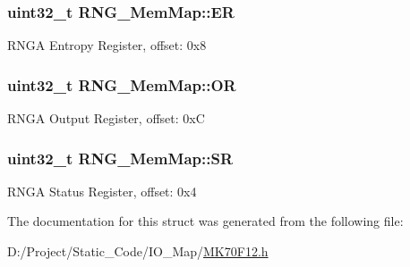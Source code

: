 \subsubsection[{E\+R}]{\setlength{\rightskip}{0pt plus 5cm}uint32\+\_\+t R\+N\+G\+\_\+\+Mem\+Map\+::\+E\+R}\label{struct_r_n_g___mem_map_a00c023d8dafb81ac55c86b3ad8decb3d}
R\+N\+G\+A Entropy Register, offset\+: 0x8 \hypertarget{struct_r_n_g___mem_map_a28a39f4167d28546cea918687d2951f1}{}
\subsubsection[{O\+R}]{\setlength{\rightskip}{0pt plus 5cm}uint32\+\_\+t R\+N\+G\+\_\+\+Mem\+Map\+::\+O\+R}\label{struct_r_n_g___mem_map_a28a39f4167d28546cea918687d2951f1}
R\+N\+G\+A Output Register, offset\+: 0x\+C \hypertarget{struct_r_n_g___mem_map_a5d258b2ed1915070a6d3651092d8f3c7}{}
\subsubsection[{S\+R}]{\setlength{\rightskip}{0pt plus 5cm}uint32\+\_\+t R\+N\+G\+\_\+\+Mem\+Map\+::\+S\+R}\label{struct_r_n_g___mem_map_a5d258b2ed1915070a6d3651092d8f3c7}
R\+N\+G\+A Status Register, offset\+: 0x4 

The documentation for this struct was generated from the following file\+:\begin{DoxyCompactItemize}
\item 
D\+:/\+Project/\+Static\+\_\+\+Code/\+I\+O\+\_\+\+Map/\hyperlink{_m_k70_f12_8h}{M\+K70\+F12.\+h}\end{DoxyCompactItemize}
